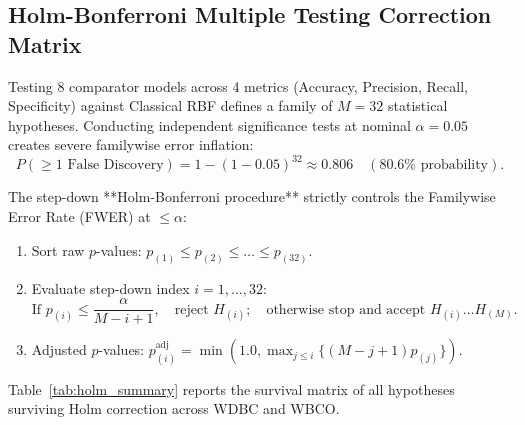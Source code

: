 \documentclass[11pt,a4paper]{article}
\begin{document}
\subsection{Holm-Bonferroni Multiple Testing Correction Matrix}

Testing 8 comparator models across 4 metrics (Accuracy, Precision, Recall, Specificity) against Classical RBF defines a family of $M = 32$ statistical hypotheses. Conducting independent significance tests at nominal $\alpha = 0.05$ creates severe familywise error inflation:
\begin{equation}
P(\ge 1 \text{ False Discovery}) = 1 - (1 - 0.05)^{32} \approx 0.806 \quad (80.6\% \text{ probability}).
\end{equation}

The step-down **Holm-Bonferroni procedure** strictly controls the Familywise Error Rate (FWER) at $\le \alpha$:
\begin{enumerate}[noitemsep]
    \item Sort raw $p$-values: $p_{(1)} \le p_{(2)} \le \dots \le p_{(32)}$.
    \item Evaluate step-down index $i = 1, \dots, 32$:
    \begin{equation}
    \text{If } p_{(i)} \le \frac{\alpha}{M - i + 1}, \quad \text{reject } H_{(i)}; \quad \text{otherwise stop and accept } H_{(i)} \dots H_{(M)}.
    \end{equation}
    \item Adjusted $p$-values: $p_{(i)}^{\text{adj}} = \min\left(1.0, \max_{j \le i} \{(M - j + 1) p_{(j)}\}\right)$.
\end{enumerate}

Table~\ref{tab:holm_summary} reports the survival matrix of all hypotheses surviving Holm correction across WDBC and WBCO.
\end{document}
